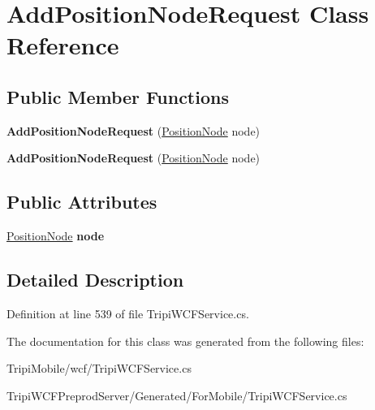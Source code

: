 \hypertarget{class_add_position_node_request}{
\section{AddPositionNodeRequest Class Reference}
\label{class_add_position_node_request}
}
\subsection*{Public Member Functions}
\begin{DoxyCompactItemize}
\item 
\hypertarget{class_add_position_node_request_aa994980cd595f2e2a87610938ca906dd}{
{\bfseries AddPositionNodeRequest} (\hyperlink{class_position_node}{PositionNode} node)}
\label{class_add_position_node_request_aa994980cd595f2e2a87610938ca906dd}

\item 
\hypertarget{class_add_position_node_request_aa994980cd595f2e2a87610938ca906dd}{
{\bfseries AddPositionNodeRequest} (\hyperlink{class_position_node}{PositionNode} node)}
\label{class_add_position_node_request_aa994980cd595f2e2a87610938ca906dd}

\end{DoxyCompactItemize}
\subsection*{Public Attributes}
\begin{DoxyCompactItemize}
\item 
\hypertarget{class_add_position_node_request_a98570a553fd4a773e2992f1b30762b50}{
\hyperlink{class_position_node}{PositionNode} {\bfseries node}}
\label{class_add_position_node_request_a98570a553fd4a773e2992f1b30762b50}

\end{DoxyCompactItemize}


\subsection{Detailed Description}


Definition at line 539 of file TripiWCFService.cs.

The documentation for this class was generated from the following files:\begin{DoxyCompactItemize}
\item 
TripiMobile/wcf/TripiWCFService.cs\item 
TripiWCFPreprodServer/Generated/ForMobile/TripiWCFService.cs\end{DoxyCompactItemize}
